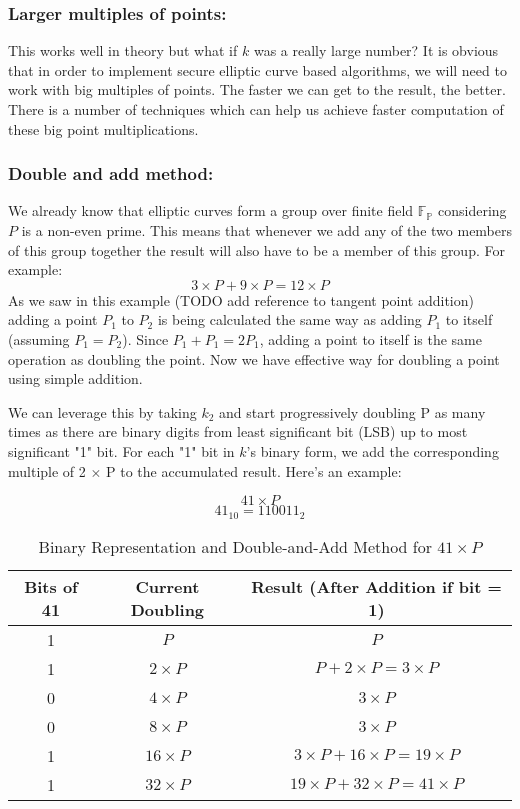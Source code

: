\documentclass[bp,en]{FEIstyle}
\begin{document}
\subsubsection*{Larger multiples of points:}
This works well in theory but what if $k$ was a really large number? It is obvious that in order to implement secure elliptic curve based algorithms, we will need to work with big multiples of points. The faster we can get to the result, the better. There is a number of techniques which can help us achieve faster computation of these big point multiplications.


\subsubsection*{Double and add method:}
We already know that elliptic curves form a group over finite field $\mathbb{F}_\mathbb{P}$ considering $P$ is a non-even prime. This means that whenever we add any of the two members of this group together the result will also have to be a member of this group. For example:
\[
3 \times P + 9 \times P = 12 \times P
\]
As we saw in this example (TODO add reference to tangent point addition) adding a point $P_1$ to $P_2$ is being calculated the same way as adding $P_1$ to itself (assuming $P_1=P_2$). Since $P_1+P_1=2P_1$, adding a point to itself is the same operation as doubling the point. Now we have effective way for doubling a point using simple addition. 

We can leverage this by taking $k_2$ and start progressively doubling P as many times as there are binary digits from least significant bit (LSB) up to most significant "1" bit. For each "1" bit in $k$'s binary form, we add the corresponding multiple of 2 $\times$ P to the accumulated result. Here's an example:

\[
41 \times P 
\]
\[
41_{10} = 110011_2  
\]
\begin{table}[H]
\centering
\begin{tabular}{|c|c|c|}
\hline
\textbf{Bits of 41} & \textbf{Current Doubling} & \textbf{Result (After Addition if bit = 1)} \\ \hline
1 & $P$ & $P$ \\ \hline
1 & $2\times P$ & $P+2\times P=3\times P$ \\ \hline
0 & $4\times P$ & $3\times P$ \\ \hline
0 & $8\times P$ & $3\times P$ \\ \hline
1 & $16\times P$ & $3\times P+16\times P=19\times P$ \\ \hline
1 & $32\times P$ & $19\times P+32\times P=41\times P$ \\ \hline
\end{tabular}
\caption{Binary Representation and Double-and-Add Method for $41 \times P$}\end{table}
\end{document}
